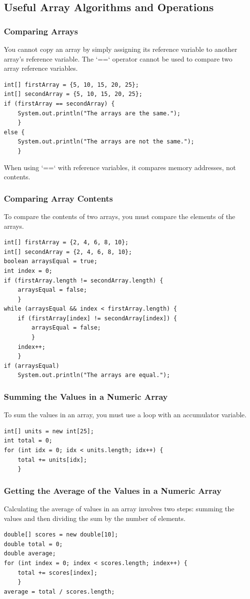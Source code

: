\documentclass[11pt]{beamer}
\begin{document}
\subsection{Useful Array Algorithms and Operations}
\begin{frame}[fragile]
    \frametitle{Comparing Arrays}
    You cannot copy an array by simply assigning its reference variable to another array's reference variable. The `==` operator cannot be used to compare two array reference variables.
    \begin{lstlisting}
int[] firstArray = {5, 10, 15, 20, 25};
int[] secondArray = {5, 10, 15, 20, 25};
if (firstArray == secondArray) {
    System.out.println("The arrays are the same.");
    }
else {
    System.out.println("The arrays are not the same.");
    }
    \end{lstlisting}
    When using `==` with reference variables, it compares memory addresses, not contents.
\end{frame}

\begin{frame}[fragile]
    \frametitle{Comparing Array Contents}
    To compare the contents of two arrays, you must compare the elements of the arrays.
    \begin{lstlisting}[basicstyle=\ttfamily\footnotesize]
int[] firstArray = {2, 4, 6, 8, 10};
int[] secondArray = {2, 4, 6, 8, 10};
boolean arraysEqual = true;
int index = 0;
if (firstArray.length != secondArray.length) {
    arraysEqual = false;
    }
while (arraysEqual && index < firstArray.length) {
    if (firstArray[index] != secondArray[index]) {
        arraysEqual = false;
        }
    index++;
    }
if (arraysEqual)
    System.out.println("The arrays are equal.");
    \end{lstlisting}
\end{frame}

\begin{frame}[fragile]
    \frametitle{Summing the Values in a Numeric Array}
    To sum the values in an array, you must use a loop with an accumulator variable.
    \begin{lstlisting}
int[] units = new int[25];
int total = 0;
for (int idx = 0; idx < units.length; idx++) {
    total += units[idx];
    }
    \end{lstlisting}
\end{frame}

\begin{frame}[fragile]
    \frametitle{Getting the Average of the Values in a Numeric Array}
    Calculating the average of values in an array involves two steps: summing the values and then dividing the sum by the number of elements.
    \begin{lstlisting}
double[] scores = new double[10];
double total = 0;
double average;
for (int index = 0; index < scores.length; index++) {
    total += scores[index];
    }
average = total / scores.length;
    \end{lstlisting}
\end{frame}
\end{document}
